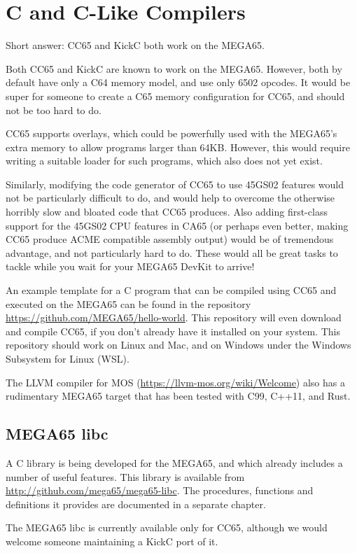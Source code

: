 \chapter{C and C-Like Compilers}

Short answer: CC65 and KickC both work on the MEGA65.

Both CC65 and KickC are known to work on the MEGA65.  However, both by
default have only a C64 memory model, and use only 6502 opcodes.
It would be super for someone to create a C65 memory configuration for
CC65, and should not be too hard to do.

CC65 supports overlays, which
could be powerfully used with the MEGA65's extra memory to allow
programs larger than 64KB.  However, this would require writing a
suitable loader for such programs, which also does not yet exist.

Similarly, modifying the code
generator of CC65 to use 45GS02 features would not be particularly
difficult to do, and would help to overcome the otherwise horribly
slow and bloated code that CC65 produces.  Also adding first-class
support for the 45GS02 CPU features in CA65 (or perhaps even better,
making CC65 produce ACME compatible assembly output) would be of
tremendous advantage, and not particularly hard to do.  These would
all be great tasks to tackle while you wait for your MEGA65 DevKit to
arrive!

An example template for a C program that can be compiled using CC65
and executed on the MEGA65 can be found in the repository
\url{https://github.com/MEGA65/hello-world}.  This repository will
even download and compile CC65, if you don't already have it installed
on your system.  This repository should work on Linux and Mac, and
on Windows under the Windows Subsystem for Linux (WSL).

The LLVM compiler for MOS (\url{https://llvm-mos.org/wiki/Welcome}) also
has a rudimentary MEGA65 target that has been tested with C99, C++11, and Rust.

\section{MEGA65 libc}

A C library is being developed for the MEGA65, and which already
includes a number of useful features. This library is available from
\url{http://github.com/mega65/mega65-libc}. The procedures,
functions and definitions it provides are documented in a separate
chapter.

The MEGA65 libc is currently available only for CC65, although we would
welcome someone maintaining a KickC port of it.
